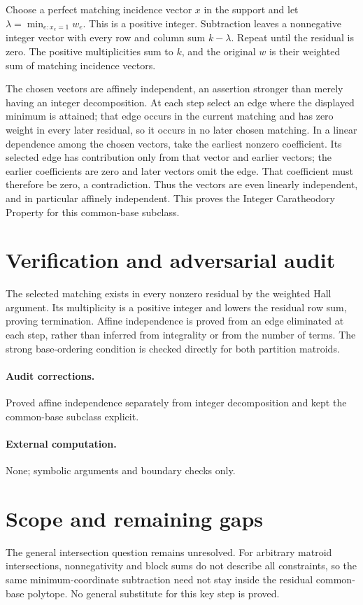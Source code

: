 \documentclass[11pt]{article}
\begin{document}
Choose a perfect matching incidence vector $x$ in the support and let $\lambda=\min_{e:x_e=1}w_e$. This is a positive integer. Subtraction leaves a nonnegative integer vector with every row and column sum $k-\lambda$. Repeat until the residual is zero. The positive multiplicities sum to $k$, and the original $w$ is their weighted sum of matching incidence vectors.

The chosen vectors are affinely independent, an assertion stronger than merely having an integer decomposition. At each step select an edge where the displayed minimum is attained; that edge occurs in the current matching and has zero weight in every later residual, so it occurs in no later chosen matching. In a linear dependence among the chosen vectors, take the earliest nonzero coefficient. Its selected edge has contribution only from that vector and earlier vectors; the earlier coefficients are zero and later vectors omit the edge. That coefficient must therefore be zero, a contradiction. Thus the vectors are even linearly independent, and in particular affinely independent. This proves the Integer Caratheodory Property for this common-base subclass.

\section{Verification and adversarial audit}
The selected matching exists in every nonzero residual by the weighted Hall argument. Its multiplicity is a positive integer and lowers the residual row sum, proving termination. Affine independence is proved from an edge eliminated at each step, rather than inferred from integrality or from the number of terms. The strong base-ordering condition is checked directly for both partition matroids.
\paragraph{Audit corrections.} Proved affine independence separately from integer decomposition and kept the common-base subclass explicit.
\paragraph{External computation.} None; symbolic arguments and boundary checks only.
\section{Scope and remaining gaps}
The general intersection question remains unresolved. For arbitrary matroid intersections, nonnegativity and block sums do not describe all constraints, so the same minimum-coordinate subtraction need not stay inside the residual common-base polytope. No general substitute for this key step is proved.
\end{document}
